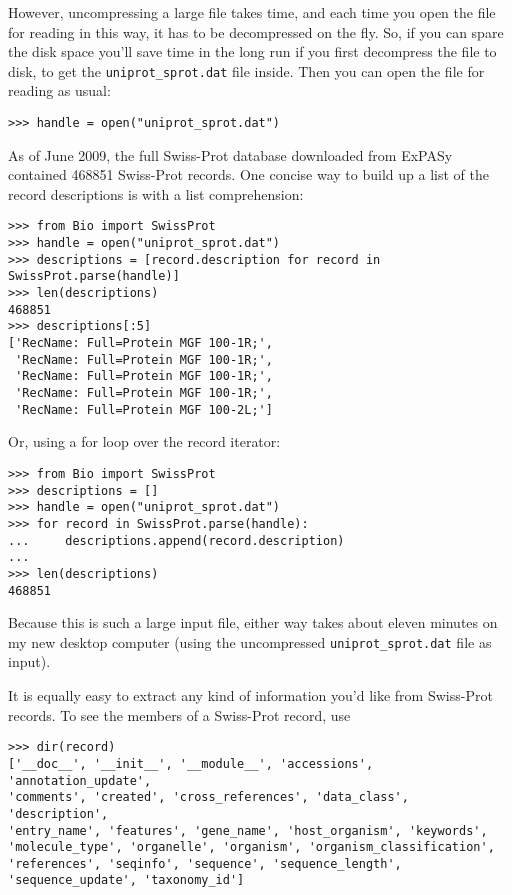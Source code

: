 \documentclass{report}
\begin{document}
However, uncompressing a large file takes time, and each time you open the file for reading in this way, it has to be decompressed on the fly.  So, if you can spare the disk space you'll save time in the long run if you first decompress the file to disk, to get the \verb|uniprot_sprot.dat| file inside.  Then you can open the file for reading as usual:

\begin{verbatim}
>>> handle = open("uniprot_sprot.dat")
\end{verbatim}

As of June 2009, the full Swiss-Prot database downloaded from ExPASy contained 468851 Swiss-Prot records.  One concise way to build up a list of the record descriptions is with a list comprehension: 
\begin{verbatim}
>>> from Bio import SwissProt
>>> handle = open("uniprot_sprot.dat")
>>> descriptions = [record.description for record in SwissProt.parse(handle)]
>>> len(descriptions)
468851
>>> descriptions[:5]
['RecName: Full=Protein MGF 100-1R;',
 'RecName: Full=Protein MGF 100-1R;',
 'RecName: Full=Protein MGF 100-1R;',
 'RecName: Full=Protein MGF 100-1R;',
 'RecName: Full=Protein MGF 100-2L;']

\end{verbatim}

Or, using a for loop over the record iterator:
\begin{verbatim}
>>> from Bio import SwissProt
>>> descriptions = []
>>> handle = open("uniprot_sprot.dat")
>>> for record in SwissProt.parse(handle):
...     descriptions.append(record.description)
...
>>> len(descriptions)
468851
\end{verbatim}

Because this is such a large input file, either way takes about eleven minutes on my new desktop computer (using the uncompressed \verb|uniprot_sprot.dat| file as input).

It is equally easy to extract any kind of information you'd like from Swiss-Prot records. To see the members of a Swiss-Prot record, use
\begin{verbatim}
>>> dir(record)
['__doc__', '__init__', '__module__', 'accessions', 'annotation_update',
'comments', 'created', 'cross_references', 'data_class', 'description',
'entry_name', 'features', 'gene_name', 'host_organism', 'keywords',
'molecule_type', 'organelle', 'organism', 'organism_classification',
'references', 'seqinfo', 'sequence', 'sequence_length',
'sequence_update', 'taxonomy_id']
\end{verbatim}
\end{document}

